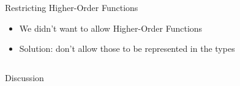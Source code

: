 \documentclass[department=icis, slidenumbers=slide, official=true]{beamerruhuisstijl}
\begin{document}
\begin{frame}{Restricting Higher-Order Functions}
    \begin{itemize}
        \item We didn't want to allow Higher-Order Functions
        \pause
        \item Solution: don't allow those to be represented in the types
    \end{itemize}

    \pause
    \inputminted{Haskell}{ex4.hs}
\end{frame}

\begin{frame}{Discussion}
    \inputminted{clean}{what_does_a_mean.spl}
\end{frame}
\end{document}
